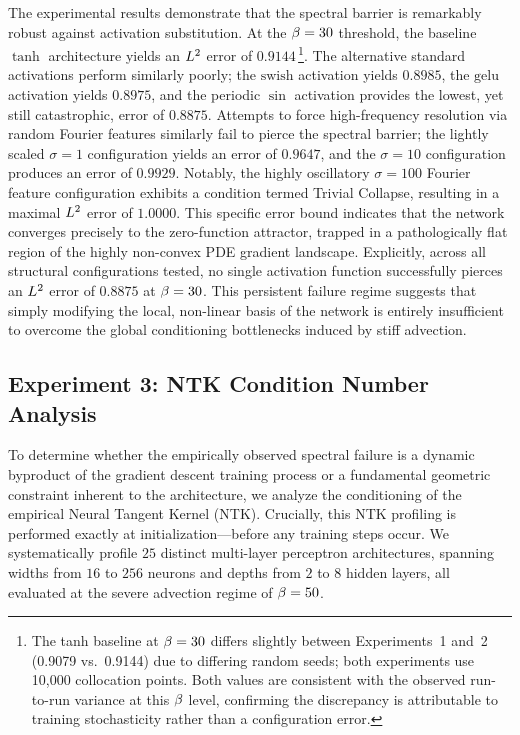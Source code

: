 The experimental results demonstrate that the spectral barrier is remarkably robust against activation substitution. At the $\beta=30$ threshold, the baseline $\tanh$ architecture yields an $L^2$ error of $0.9144$\,\footnote{The tanh baseline at $\beta=30$ differs slightly between Experiments~1 and~2 (0.9079 vs.\ 0.9144) due to differing random seeds; both experiments use 10,000 collocation points. Both values are consistent with the observed run-to-run variance at this $\beta$ level, confirming the discrepancy is attributable to training stochasticity rather than a configuration error.}. The alternative standard activations perform similarly poorly; the $\text{swish}$ activation yields $0.8985$, the $\text{gelu}$ activation yields $0.8975$, and the periodic $\sin$ activation provides the lowest, yet still catastrophic, error of $0.8875$. Attempts to force high-frequency resolution via random Fourier features similarly fail to pierce the spectral barrier; the lightly scaled $\sigma=1$ configuration yields an error of $0.9647$, and the $\sigma=10$ configuration produces an error of $0.9929$. Notably, the highly oscillatory $\sigma=100$ Fourier feature configuration exhibits a condition termed Trivial Collapse, resulting in a maximal $L^2$ error of $1.0000$. This specific error bound indicates that the network converges precisely to the zero-function attractor, trapped in a pathologically flat region of the highly non-convex PDE gradient landscape. Explicitly, across all structural configurations tested, no single activation function successfully pierces an $L^2$ error of $0.8875$ at $\beta=30$. This persistent failure regime suggests that simply modifying the local, non-linear basis of the network is entirely insufficient to overcome the global conditioning bottlenecks induced by stiff advection.

\subsection{Experiment 3: NTK Condition Number Analysis}\label{sec:exp3}

To determine whether the empirically observed spectral failure is a dynamic byproduct of the gradient descent training process or a fundamental geometric constraint inherent to the architecture, we analyze the conditioning of the empirical Neural Tangent Kernel (NTK). Crucially, this NTK profiling is performed exactly at initialization—before any training steps occur. We systematically profile $25$ distinct multi-layer perceptron architectures, spanning widths from $16$ to $256$ neurons and depths from $2$ to $8$ hidden layers, all evaluated at the severe advection regime of $\beta=50$.

